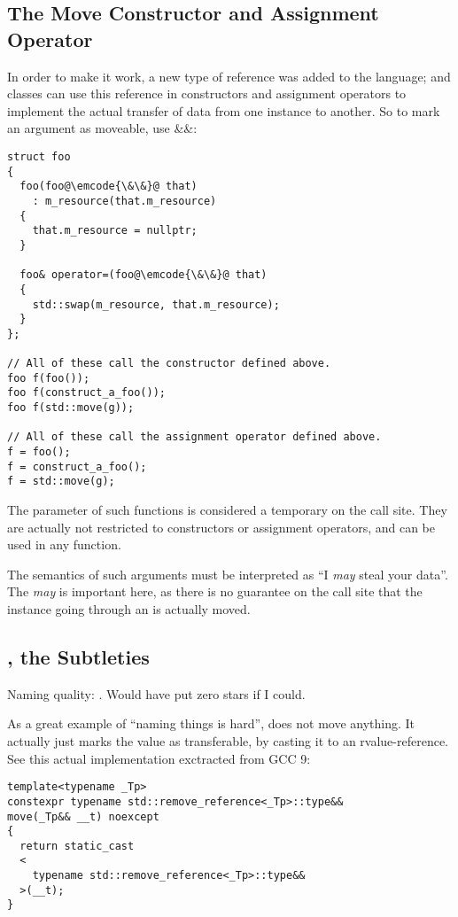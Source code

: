 \subsection{The Move Constructor and Assignment Operator}

In order to make it work, a new type of reference was added to
the language; and classes can use this reference in constructors and
assignment operators to implement the actual transfer of data from one
instance to another. So to mark an argument as moveable, use \&\&:

\begin{lstlisting}
struct foo
{
  foo(foo@\emcode{\&\&}@ that)
    : m_resource(that.m_resource)
  {
    that.m_resource = nullptr;
  }

  foo& operator=(foo@\emcode{\&\&}@ that)
  {
    std::swap(m_resource, that.m_resource);
  }
};

// All of these call the constructor defined above.
foo f(foo());
foo f(construct_a_foo());
foo f(std::move(g));

// All of these call the assignment operator defined above.
f = foo();
f = construct_a_foo();
f = std::move(g);
\end{lstlisting}

The parameter of such functions is considered a temporary on the call
site. They are actually not restricted to constructors or assignment
operators, and can be used in any function.

The semantics of such arguments must be interpreted as ``I {\em may}
steal your data''. The {\em may} is important here, as there is no
guarantee on the call site that the instance going through an
 is actually moved.

\subsection{, the Subtleties}

Naming quality: \faStar\faStarO\faStarO\faStarO\faStarO. Would have
put zero stars if I could.

As a great example of ``naming things is hard'',  does
not move anything. It actually just marks the value as transferable,
by casting it to an rvalue-reference. See this actual implementation
exctracted from GCC 9:

\begin{lstlisting}
template<typename _Tp>
constexpr typename std::remove_reference<_Tp>::type&&
move(_Tp&& __t) noexcept
{
  return static_cast
  <
    typename std::remove_reference<_Tp>::type&&
  >(__t);
}
\end{lstlisting}

